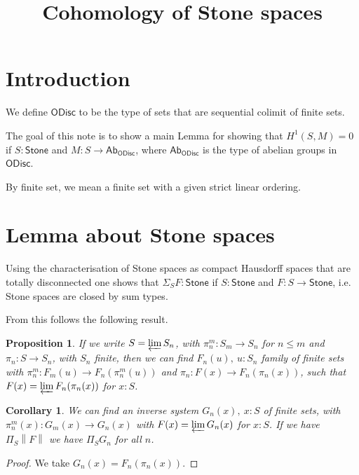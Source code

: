 \documentclass[10pt,a4paper]{article}
\newtheorem{corollary}{Corollary}[section]
\newtheorem{proposition}{Proposition}[section]
\newcommand{\ODisc}{\mathsf{ODisc}}
\newcommand{\Stone}{\mathsf{Stone}}
\newcommand{\OAbG}{\mathsf{Ab_{ODisc}}}
\newcommand{\ra}{\rightarrow}
\newcommand\norm[1]{\left\lVert #1 \right\rVert}
\begin{document}
\title{Cohomology of Stone spaces}

\author{}
\date{}
\maketitle


\section*{Introduction}

We define $\ODisc$ to be the type of sets that are sequential colimit of finite sets.

The goal of this note is to show a main Lemma for showing that $H^1(S,M) = 0$ if
$S:\Stone$ and $M:S\ra \OAbG$, where $\OAbG$ is the type of abelian groups in $\ODisc$.

 By finite set, we mean a finite set with a given strict linear ordering.

\section{Lemma about Stone spaces}

Using the characterisation of Stone spaces as compact Hausdorff spaces that are totally disconnected one shows
that $\Sigma_SF:\Stone$ if $S:\Stone$ and $F:S\ra\Stone$, i.e. Stone spaces are closed by sum types.

From this follows the following result.

\begin{proposition}\label{sumStone}
  If we write $S = \varprojlim S_n$, with $\pi_n^m : S_m\ra S_n$ for $n\leqslant m$
  and $\pi_n:S\ra S_n$, with $S_n$ finite,
  then we can find $F_n(u),~u:S_n$ family of finite sets with $\pi_n^m:F_m(u)\ra F_n(\pi_n^m(u))$
  and $\pi_n:F(x)\ra F_n(\pi_n(x))$,
  such that $F(x) = \varprojlim F_n(\pi_n(x))$ for $x:S$.
\end{proposition}

\begin{corollary}\label{corStone}
  We can find an inverse system $G_n(x),~x:S$ of finite sets, with $\pi_n^m(x) : G_m(x)\ra G_n(x)$
  with $F(x) = \varprojlim G_n(x)$ for $x:S$. If we have $\Pi_S\norm{F}$ we have $\Pi_SG_n$ for all $n$.
\end{corollary}

\begin{proof}
  We take $G_n(x) = F_n(\pi_n(x))$.
\end{proof}
\end{document}
